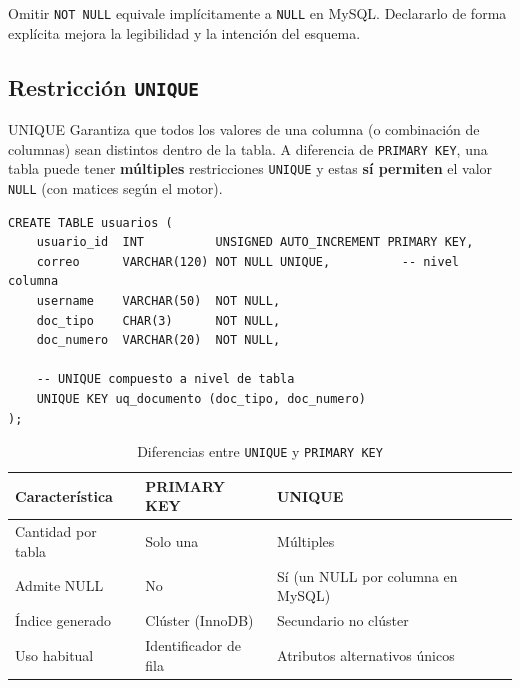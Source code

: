 \begin{nota}
  Omitir \texttt{NOT NULL} equivale implícitamente a \texttt{NULL} en MySQL.
  Declararlo de forma explícita mejora la legibilidad y la intención del
  esquema.
\end{nota}

\subsection{Restricción \texttt{UNIQUE}}

\begin{definicion}{UNIQUE}
  Garantiza que todos los valores de una columna (o combinación de columnas)
  sean distintos dentro de la tabla. A diferencia de \texttt{PRIMARY KEY},
  una tabla puede tener \textbf{múltiples} restricciones \texttt{UNIQUE} y
  estas \textbf{sí permiten} el valor \texttt{NULL} (con matices según el
  motor).
\end{definicion}

\begin{lstlisting}[style=sql, caption={UNIQUE a nivel de columna y de tabla}]
CREATE TABLE usuarios (
    usuario_id  INT          UNSIGNED AUTO_INCREMENT PRIMARY KEY,
    correo      VARCHAR(120) NOT NULL UNIQUE,          -- nivel columna
    username    VARCHAR(50)  NOT NULL,
    doc_tipo    CHAR(3)      NOT NULL,
    doc_numero  VARCHAR(20)  NOT NULL,

    -- UNIQUE compuesto a nivel de tabla
    UNIQUE KEY uq_documento (doc_tipo, doc_numero)
);
\end{lstlisting}

\begin{table}[H]
  \centering
  \caption{Diferencias entre \texttt{UNIQUE} y \texttt{PRIMARY KEY}}
  \renewcommand{\arraystretch}{1.3}
  \begin{tabularx}{\textwidth}{l X X}
    \toprule
    \textbf{Característica} & \textbf{PRIMARY KEY}          & \textbf{UNIQUE}                      \\
    \midrule
    Cantidad por tabla      & Solo una                      & Múltiples                            \\
    Admite NULL             & No                            & Sí (un NULL por columna en MySQL)    \\
    Índice generado         & Clúster (InnoDB)              & Secundario no clúster                \\
    Uso habitual            & Identificador de fila         & Atributos alternativos únicos        \\
    \bottomrule
  \end{tabularx}
\end{table}


